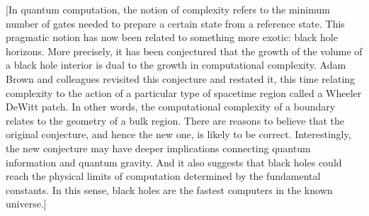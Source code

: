 \documentclass[a4paper,12pt,nofootinbib]{article}
\begin{document}
[In quantum computation, the notion of complexity refers to the minimum number of gates needed to prepare a certain state from a reference state. This pragmatic notion has now been related to something more exotic: black hole horizons. More precisely, it has been conjectured that the growth of the volume of a black hole interior is dual to the growth in computational complexity. Adam Brown and colleagues revisited this conjecture and restated it, this time relating complexity to the action of a particular type of spacetime region called a Wheeler DeWitt patch. In other words, the computational complexity of a boundary relates to the geometry of a bulk region.
There are reasons to believe that the original conjecture, and hence the new one, is likely to be correct. Interestingly, the new conjecture may have deeper implications connecting quantum information and quantum gravity. And it also suggests that black holes could reach the physical limits of computation determined by the fundamental constants. In this sense, black holes are the fastest computers in the known universe.]



\end{document}
